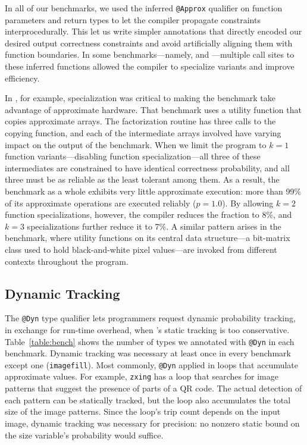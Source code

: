 \documentclass[10pt,nocopyrightspace,preprint]{sigplanconf}
\newcommand{\code}{\lstinline[emphstyle={},keywordstyle={}]}
\begin{document}
In all of our benchmarks, we used the inferred \code{@Approx} qualifier on
function parameters and return types to let the compiler propagate constraints
interprocedurally.
This let us write simpler annotations that directly encoded our desired output
correctness constraints and avoid artificially aligning them with function
boundaries.
In some benchmarks---namely,  and ---multiple call
sites to these inferred functions allowed the compiler to specialize variants
and improve efficiency.

In , for example, specialization was critical to making the
benchmark take advantage of approximate hardware.
That benchmark uses a utility function that copies approximate arrays.
The factorization routine has three calls to the copying function, and each of
the intermediate arrays involved have varying impact on the output of the
benchmark.
When we limit the program to $k=1$ function variants---disabling function
specialization---all three of these intermediates are constrained to
have identical correctness probability, and all three must be as reliable as
the least tolerant among them.
As a result, the benchmark as a whole exhibits very little approximate
execution: more than 99\% of its approximate operations are executed reliably
($p = 1.0$).
By allowing $k=2$ function specializations, however, the compiler reduces the
fraction to 8\%, and $k=3$ specializations further reduce it to 7\%.
A similar pattern arises in the  benchmark, where utility functions
on its central data structure---a bit-matrix class used to hold
black-and-white pixel values---are invoked from different contexts
throughout the program.


\subsection{Dynamic Tracking}

The \code{@Dyn} type qualifier lets programmers request dynamic
probability tracking, in exchange for run-time overhead, when \lang's static
tracking is too conservative.
Table~\ref{table:bench} shows the number of types we annotated with
\code{@Dyn} in each benchmark.
Dynamic tracking was necessary at least once in every benchmark except one
(\code{imagefill}).
Most commonly, \code{@Dyn} applied in loops that accumulate approximate
values.
For example, \code{zxing} has a loop that searches for image patterns that
suggest the presence of parts of a QR code.
The actual detection of each pattern can be statically tracked, but the loop
also accumulates the total size of the image patterns.
Since the loop's trip count depends on the input image, dynamic tracking was
necessary for precision:
no nonzero static bound on the size variable's probability would suffice.
\end{document}
